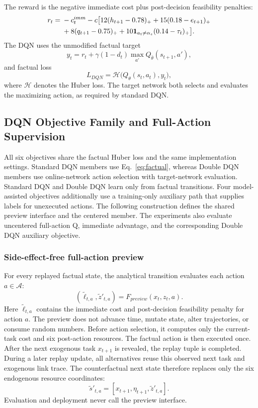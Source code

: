 \documentclass[remotesensing,article,submit,moreauthors]{Definitions/mdpi}
\begin{document}
The reward is the negative immediate cost plus post-decision feasibility penalties:
\begin{align}
r_t={}&-c_t^{imm}-c\big[12(h_{t+1}-0.78)_+ +15(0.18-e_{t+1})_+\notag\\
&+8(q_{t+1}-0.75)_+ +10\mathbf 1_{a_t\ne\alpha_s}(0.14-\tau_t)_+\big].
\label{eq:reward}
\end{align}
The DQN uses the unmodified factual target
\begin{equation}
y_t=r_t+\gamma(1-d_t)\max_{a'}Q_{\bar\theta}(s_{t+1},a'),
\label{eq:factual}
\end{equation}
and factual loss
\begin{equation}
L_{DQN}=\mathcal H\big(Q_\theta(s_t,a_t),y_t\big),
\end{equation}
where $\mathcal H$ denotes the Huber loss. The target network both selects and evaluates the maximizing action, as required by standard DQN.

\subsection{DQN Objective Family and Full-Action Supervision}
\label{sec:method}

All six objectives share the factual Huber loss and the same implementation settings. Standard DQN members use Eq.~\eqref{eq:factual}, whereas Double DQN members use online-network action selection with target-network evaluation. Standard DQN and Double DQN learn only from factual transitions. Four model-assisted objectives additionally use a training-only auxiliary path that supplies labels for unexecuted actions. The following construction defines the shared preview interface and the centered member. The experiments also evaluate uncentered full-action Q, immediate advantage, and the corresponding Double DQN auxiliary objective.

\subsubsection{Side-effect-free full-action preview}

For every replayed factual state, the analytical transition evaluates each action $a\in\mathcal A$:
\begin{equation}
(\tilde \ell_{t,a},\tilde z'_{t,a})=F_{preview}(x_t,z_t,a).
\end{equation}
Here $\tilde \ell_{t,a}$ contains the immediate cost and post-decision feasibility penalty for action $a$. The preview does not advance time, mutate state, alter trajectories, or consume random numbers. Before action selection, it computes only the current-task cost and six post-action resources. The factual action is then executed once. After the next exogenous task $x_{t+1}$ is revealed, the replay tuple is completed. During a later replay update, all alternatives reuse this observed next task and exogenous link trace. The counterfactual next state therefore replaces only the six endogenous resource coordinates:
\begin{equation}
\tilde s'_{t,a}=[x_{t+1},\eta_{t+1},\tilde z'_{t,a}].
\end{equation}
Evaluation and deployment never call the preview interface.
\end{document}
